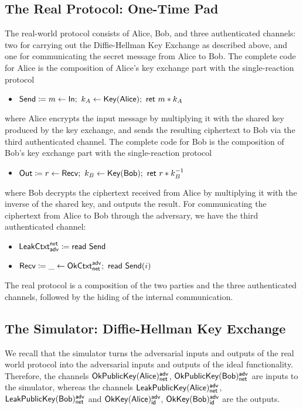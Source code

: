 \subsection{The Real Protocol: One-Time Pad}
The real-world protocol consists of Alice, Bob, and three authenticated channels: two for carrying out the Diffie-Hellman Key Exchange as described above, and one for communicating the secret message from Alice to Bob. The complete code for Alice is the composition of Alice's key exchange part with the single-reaction protocol
\begin{itemize}
\item $\Send \coloneqq m \leftarrow \In; \ k_A \leftarrow \Key(\Alice); \ \ret{m * k_A}$
\end{itemize}
where Alice encrypts the input message by multiplying it with the shared key produced by the key exchange, and sends the resulting ciphertext to Bob via the third authenticated channel. The complete code for Bob is the composition of Bob's key exchange part with the single-reaction protocol
\begin{itemize}
\item $\Out \coloneqq r \leftarrow \Recv; \ k_B \leftarrow \Key(\Bob); \ \ret{r * k_B^{-1}}$
\end{itemize}
where Bob decrypts the ciphertext received from Alice by multiplying it with the inverse of the shared key, and outputs the result. For communicating the ciphertext from Alice to Bob through the adversary, we have the third authenticated channel:
\begin{itemize}
\item $\mathsf{LeakCtxt}^{\mathsf{net}}_{\mathsf{adv}} \coloneqq \mathsf{read} \ \mathsf{Send}$
\item $\mathsf{Recv} \coloneqq \_ \leftarrow \mathsf{OkCtxt}^{\mathsf{adv}}_{\mathsf{net}}; \ \mathsf{read} \ \mathsf{Send}(i)$
\end{itemize}
The real protocol is a composition of the two parties and the three authenticated channels, followed by the hiding of the internal communication. 

\subsection{The Simulator: Diffie-Hellman Key Exchange}
We recall that the simulator turns the adversarial inputs and outputs of the real world protocol into the adversarial inputs and outputs of the ideal functionality. Therefore, the channels $\mathsf{OkPublicKey}(\mathsf{Alice})^{\mathsf{adv}}_{\mathsf{net}}$, $\mathsf{OkPublicKey}(\mathsf{Bob})^{\mathsf{adv}}_{\mathsf{net}}$ are inputs to the simulator, whereas the channels $\mathsf{LeakPublicKey}(\mathsf{Alice})^{\mathsf{adv}}_{\mathsf{net}}$, $\mathsf{LeakPublicKey}(\mathsf{Bob})^{\mathsf{adv}}_{\mathsf{net}}$ and $\mathsf{OkKey}(\mathsf{Alice})^{\mathsf{adv}}_{\mathsf{id}}$, $ \mathsf{OkKey}(\mathsf{Bob})^{\mathsf{adv}}_{\mathsf{id}}$ are the outputs.

